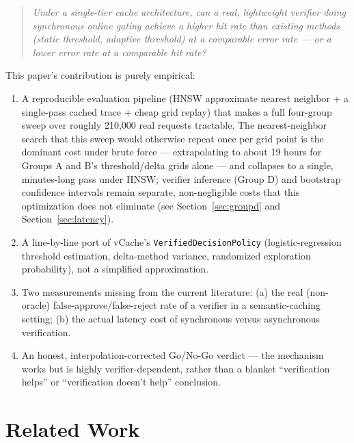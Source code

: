 \documentclass[11pt]{article}
\begin{document}
\begin{quote}
\itshape
Under a single-tier cache architecture, can a real, lightweight verifier doing synchronous online gating achieve a higher hit rate than existing methods (static threshold, adaptive threshold) at a comparable error rate --- or a lower error rate at a comparable hit rate?
\end{quote}

This paper's contribution is purely empirical:

\begin{enumerate}[leftmargin=*]
  \item A reproducible evaluation pipeline (HNSW approximate nearest neighbor + a single-pass cached trace + cheap grid replay) that makes a full four-group sweep over roughly 210{,}000 real requests tractable. The nearest-neighbor search that this sweep would otherwise repeat once per grid point is the dominant cost under brute force --- extrapolating to about 19 hours for Groups A and B's threshold/delta grids alone --- and collapses to a single, minutes-long pass under HNSW; verifier inference (Group D) and bootstrap confidence intervals remain separate, non-negligible costs that this optimization does not eliminate (see Section~\ref{sec:groupd} and Section~\ref{sec:latency}).
  \item A line-by-line port of vCache's \texttt{Verified\allowbreak{}Decision\allowbreak{}Policy} (logistic-regression threshold estimation, delta-method variance, randomized exploration probability), not a simplified approximation.
  \item Two measurements missing from the current literature: (a) the real (non-oracle) false-approve/false-reject rate of a verifier in a semantic-caching setting; (b) the actual latency cost of synchronous versus asynchronous verification.
  \item An honest, interpolation-corrected Go/No-Go verdict --- the mechanism works but is highly verifier-dependent, rather than a blanket ``verification helps'' or ``verification doesn't help'' conclusion.
\end{enumerate}

\section{Related Work}
\label{sec:related}
\end{document}
